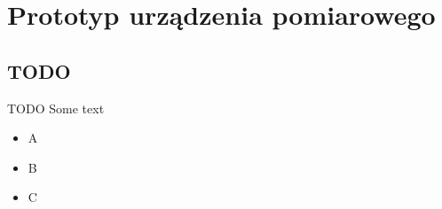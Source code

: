 \chapter{Prototyp urządzenia pomiarowego}
\label{cha:prototyp}


\section{TODO}
TODO Some text
\begin{itemize}
    \item A
    \item B
    \item C
\end{itemize}

